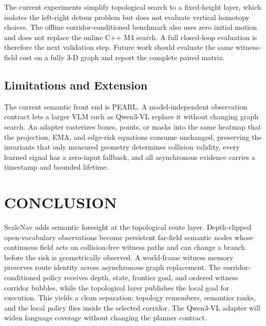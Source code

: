 \documentclass[letterpaper,10pt,conference]{ieeeconf}
\begin{document}
The current experiments simplify topological search to a fixed-height layer,
which isolates the left-right detour problem but does not evaluate vertical
homotopy choices.
The offline corridor-conditioned benchmark also uses zero initial motion and does not
replace the online C++ M4 search.  A full closed-loop evaluation is therefore
the next validation step.  Future work should evaluate the same witness-field
cost on a fully 3-D graph and report the complete paired matrix.

\subsection{Limitations and Extension}
\label{sec:extensions}
The current semantic front end is PEARL.  A model-independent observation
contract lets a larger VLM such as Qwen3-VL replace it without changing graph
search.
An adapter rasterizes boxes, points, or masks into the same heatmap that the
projection, EMA, and edge-risk equations consume unchanged, preserving the
invariants that only measured geometry determines collision validity, every
learned signal has a zero-input fallback, and all asynchronous evidence carries
a timestamp and bounded lifetime.

\section{CONCLUSION}
ScaleNav adds semantic foresight at the topological route layer.
Depth-clipped open-vocabulary observations become persistent far-field
semantic nodes whose continuous field acts on collision-free witness paths and
can change a branch before the risk is geometrically observed.
A world-frame witness memory preserves route identity across asynchronous graph
replacement.  The corridor-conditioned policy receives depth, state, frontier goal,
and ordered witness corridor bubbles, while the topological layer publishes the
local goal for execution.
This yields a clean separation: topology remembers, semantics ranks, and the
local policy flies inside the selected corridor.
The Qwen3-VL adapter will widen language coverage without changing the planner
contract.
\end{document}
